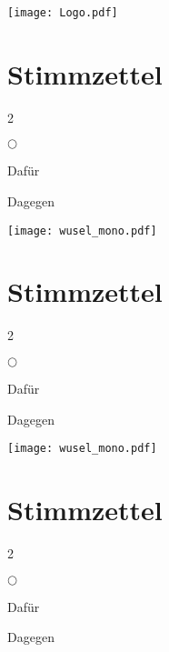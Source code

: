 \huge
\hfill
\texttt{[image: Logo.pdf]}
\vspace{-1em}
\section*{Stimmzettel}

\begin{multicols}{2}
    \begin{list}{$\bigcirc$}{}
        \item Dafür
        \item Dagegen
    \end{list}
\end{multicols}

\vspace{3em}

\huge
\hfill
\texttt{[image: wusel\_mono.pdf]}
\vspace{-1em}
\section*{Stimmzettel}

\begin{multicols}{2}
    \begin{list}{$\bigcirc$}{}
        \item Dafür
        \item Dagegen
    \end{list}
\end{multicols}

\vspace{3em}

\huge
\hfill
\texttt{[image: wusel\_mono.pdf]}
\vspace{-1em}
\section*{Stimmzettel}

\begin{multicols}{2}
    \begin{list}{$\bigcirc$}{}
        \item Dafür
        \item Dagegen
    \end{list}
\end{multicols}